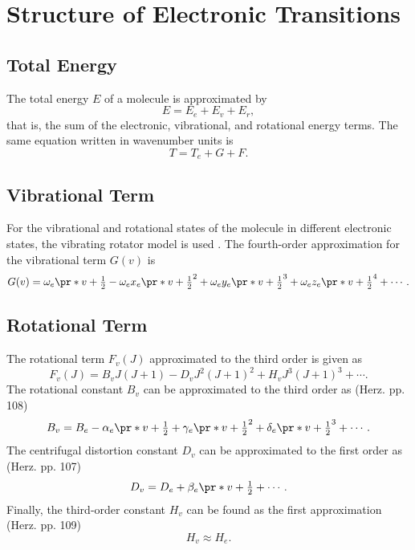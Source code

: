 \chapter{Structure of Electronic Transitions}
\label{c:structure_of_electronic_transitions}

\section{Total Energy}
\label{s:total_energy}

The total energy $E$ of a molecule is approximated by
\begin{equation*}
    E = E_e + E_v + E_r,
\end{equation*}
that is, the sum of the electronic, vibrational, and rotational energy terms. The same equation written in wavenumber units is
\begin{equation}
    T = T_e + G + F.
\end{equation}

\section{Vibrational Term}
\label{s:vibrational_term}

For the vibrational and rotational states of the molecule in different electronic states, the vibrating rotator model is used \cite{herzberg:diatomic}. The fourth-order approximation for the vibrational term $G(v)$ is
\begin{equation}
    G(v) = \omega_e\pr*{v + \tfrac{1}{2}} - \omega_ex_e\pr*{v + \tfrac{1}{2}}^2 + \omega_ey_e\pr*{v + \tfrac{1}{2}}^3 + \omega_ez_e\pr*{v + \tfrac{1}{2}}^4 + \dotsb.
\end{equation}

\section{Rotational Term}
\label{s:rotational_term}

The rotational term $F_v(J)$ approximated to the third order is given as
\begin{equation}
    F_v(J) = B_vJ(J + 1) - D_vJ^2(J + 1)^2 + H_vJ^3(J + 1)^3 + \dotsb.
\end{equation}
The rotational constant $B_v$ can be approximated to the third order as (Herz. pp. 108)
\begin{equation*}
    B_v = B_e - \alpha_e\pr*{v + \tfrac{1}{2}} + \gamma_e\pr*{v + \tfrac{1}{2}}^2 + \delta_e\pr*{v + \tfrac{1}{2}}^3 + \dotsb.
\end{equation*}
The centrifugal distortion constant $D_v$ can be approximated to the first order as (Herz. pp. 107)
\begin{equation}
    D_v = D_e + \beta_e\pr*{v + \tfrac{1}{2}} + \dotsb.
\end{equation}
Finally, the third-order constant $H_v$ can be found as the first approximation (Herz. pp. 109)
\begin{equation}
    H_v \approx H_e.
\end{equation}


